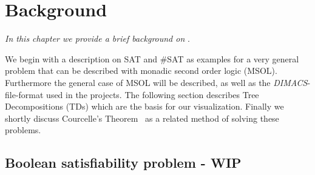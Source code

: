 \documentclass[a4paper, 12pt, bibliography=totoc]{scrartcl}
\begin{document}
\newpage
\section{Background}
\textit{In this chapter we provide a brief background on }.

We begin with a description on SAT and \#SAT as examples for a very general problem that can be described with monadic second order logic (MSOL).
Furthermore the general case of MSOL will be described, as well as the \textit{DIMACS}-file-format used in the projects.
The following section describes Tree Decompositions (TDs) which are the basis for our visualization. 
Finally we shortly discuss Courcelle's Theorem~\cite{Courcelle2012} as a related method of solving these problems.

\subsection{Boolean satisfiability problem - WIP}


\end{document}
